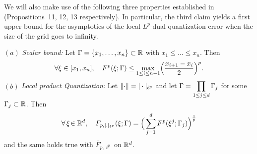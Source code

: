 We will also make use of the following three properties established
in~\cite{dualStat} (Propositions~11, 12, 13 respectively). In particular, the third claim yields  a first upper
bound for the asymptotics of the local $L^p$-dual quantization error 
when the size of
the grid goes to infinity.

\begin{prop}\label{prop:rappels}
%
$(a)$ {\em Scalar bound:} Let $\Gamma = \{x_1, \ldots, x_n\}\subset  \mathbb{R}$ with $x_1\leq \ldots\leq x_n$.
Then
\[
 \forall \xi \in [x_1, x_n],\quad F^p(\xi; \Gamma) \leq \max_{1\leq i \leq n-1}
\Bigl(\frac{x_{i+1}-x_i}{2}\Bigr)^p.
\]
%
$(b)$ {\em Local product Quantization:}
Let $\lVert\cdot\rVert = |\cdot|_{\ell^p}$ 
and let $\Gamma = \displaystyle\prod_{1\le j\le d} \Gamma_j$ for some $\Gamma_j
\subset \mathbb{R}$. Then 
\[ 
 \forall\, \xi\!\in \mathbb{R}^d, \quad F_{p, |.|_{\ell^p}}(\xi; \Gamma) = \Big(\sum_{j=1}^d F^p(\xi^j;
\Gamma_j)\Big)^{\frac 1p} 
\]
and the same holds true with $\bar F_{p,\ell^p}$ on $\mathbb{R}^d$.

\end{prop}

